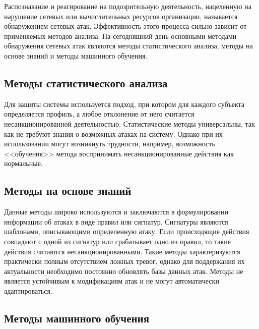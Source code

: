 Распознавание и реагирование на подозрительную деятельность,
нацеленную на нарушение сетевых или вычислительных ресурсов организации,
называется обнаружением сетевых атак.
Эффективность этого процесса сильно зависит от применяемых методов анализа.
На сегодняшний день основными методами обнаружения сетевых атак являются методы статистического анализа,
методы на основе знаний и методы машинного обучения.


\subsection{Методы статистического анализа}
Для защиты системы используется подход, при котором для каждого субъекта определяется профиль,
а любое отклонение от него считается несанкционированной деятельностью. 
Статистические методы универсальны, так как не требуют знания о возможных атаках на систему.
Однако при их использовании могут возникнуть трудности, например, возможность <<обучения>> метода
воспринимать несанкционированные действия как нормальные.

\subsection{Методы на основе знаний}
Данные методы широко используются и заключаются в формулировании информации об атаках в виде правил или сигнатур.
Сигнатуры являются шаблонами, описывающими определенную атаку.
Если происходящие действия совпадают с одной из сигнатур или срабатывает одно из правил,
то такие действия считаются несанкционированными. Такие методы
характеризуются практически полным отсутствием ложных тревог, 
однако для поддержания их актуальности необходимо постоянно обновлять базы данных атак. Методы не 
является устойчивым к модификациям атак и не могут автоматически адаптироваться.

\subsection{Методы машинного обучения}

